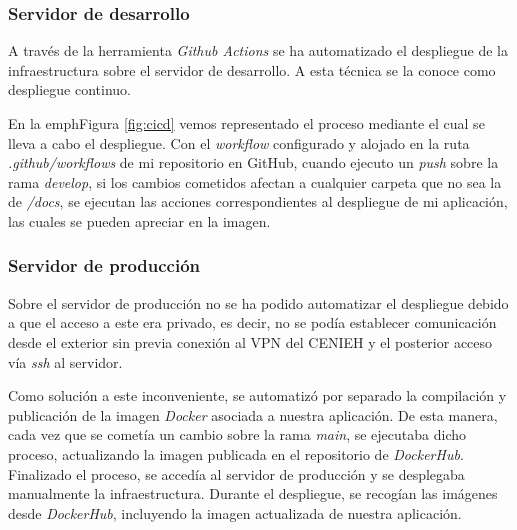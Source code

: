 \subsubsection{Servidor de desarrollo}

A través de la herramienta \emph{Github Actions} se ha automatizado el
despliegue de la infraestructura sobre el servidor de desarrollo. A esta
técnica se la conoce como despliegue continuo.


En la emph{Figura} \ref{fig:cicd} vemos representado el proceso mediante el cual se lleva
a cabo el despliegue. Con el \emph{workflow} configurado y alojado en la
ruta \emph{.github/workflows} de mi repositorio en GitHub, cuando
ejecuto un \emph{push} sobre la rama \emph{develop}, si los cambios
cometidos afectan a cualquier carpeta que no sea la de \emph{/docs}, se
ejecutan las acciones correspondientes al despliegue de mi aplicación,
las cuales se pueden apreciar en la imagen.

\subsubsection{Servidor de producción}

Sobre el servidor de producción no se ha podido automatizar el
despliegue debido a que el acceso a este era privado, es decir, no se
podía establecer comunicación desde el exterior sin previa conexión al
VPN del CENIEH y el posterior acceso vía \emph{ssh} al servidor.


Como solución a este inconveniente, se automatizó por separado la
compilación y publicación de la imagen \emph{Docker} asociada a nuestra
aplicación. De esta manera, cada vez que se cometía un cambio sobre la
rama \emph{main}, se ejecutaba dicho proceso, actualizando la imagen
publicada en el repositorio de \emph{DockerHub}. Finalizado el proceso,
se accedía al servidor de producción y se desplegaba manualmente la
infraestructura. Durante el despliegue, se recogían las imágenes desde
\emph{DockerHub}, incluyendo la imagen actualizada de nuestra
aplicación.
